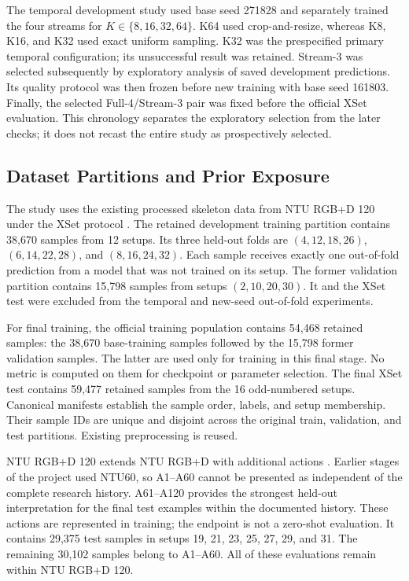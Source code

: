 \documentclass[ai,article,submit,moreauthors]{Definitions/mdpi}
\begin{document}
The temporal development study used base seed 271828 and separately trained
the four streams for $K\in\{8,16,32,64\}$. K64 used crop-and-resize, whereas
K8, K16, and K32 used exact uniform sampling. K32 was the prespecified primary
temporal configuration; its unsuccessful result was retained. Stream-3 was selected
subsequently by exploratory analysis of saved development predictions. Its
quality protocol was then frozen before new training with base seed 161803.
Finally, the selected Full-4/Stream-3 pair was fixed before the official XSet
evaluation. This chronology separates the exploratory selection from the
later checks; it does not recast the entire study as prospectively selected.

\subsection{Dataset Partitions and Prior Exposure}

The study uses the existing processed skeleton data from NTU RGB+D 120 under
the XSet protocol \cite{shahroudy2016ntu60,liu2019ntu120}. The retained
development training partition contains 38,670 samples from 12 setups.
Its three held-out folds are $(4,12,18,26)$, $(6,14,22,28)$, and
$(8,16,24,32)$. Each sample receives exactly one out-of-fold prediction from
a model that was not trained on its setup. The former validation partition
contains 15,798 samples from setups $(2,10,20,30)$. It and the XSet test
were excluded from the temporal and new-seed out-of-fold experiments.

For final training, the official training population contains 54,468 retained
samples: the 38,670 base-training samples followed by the 15,798 former
validation samples. The latter are used only for training in this final stage.
No metric is computed on them for checkpoint or parameter selection. The
final XSet test contains 59,477 retained samples from the 16 odd-numbered
setups. Canonical manifests establish the sample order, labels, and setup
membership. Their sample IDs are unique and disjoint across the original
train, validation, and test partitions. Existing preprocessing is reused.

NTU RGB+D 120 extends NTU RGB+D with additional actions \cite{ntuofficial}.
Earlier stages of the project used NTU60, so A1--A60 cannot be presented as
independent of the complete research history. A61--A120 provides the strongest
held-out interpretation for the final test examples within the documented
history. These actions are represented in training; the endpoint is not a
zero-shot evaluation. It contains 29,375 test samples in setups
19, 21, 23, 25, 27, 29, and 31. The remaining 30,102 samples belong to
A1--A60. All of these evaluations remain within NTU RGB+D 120.
\end{document}
